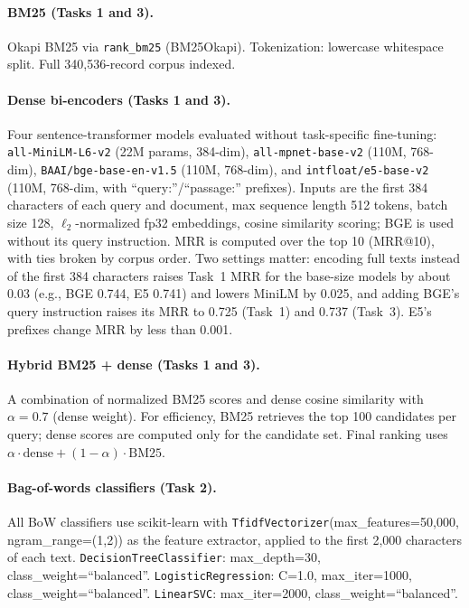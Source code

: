 \documentclass{article}
\begin{document}
\paragraph{BM25 (Tasks 1 and 3).} 
Okapi BM25 via \texttt{rank\_bm25} (BM25Okapi). Tokenization: lowercase whitespace split. Full 340,536-record corpus indexed.

\paragraph{Dense bi-encoders (Tasks 1 and 3).}
Four sentence-transformer models evaluated without task-specific fine-tuning: \texttt{all-MiniLM-L6-v2} (22M params, 384-dim), \texttt{all-mpnet-base-v2} (110M, 768-dim), \texttt{BAAI/bge-base-en-v1.5} (110M, 768-dim), and \texttt{intfloat/e5-base-v2} (110M, 768-dim, with ``query:''/``passage:'' prefixes). Inputs are the first 384 characters of each query and document, max sequence length 512 tokens, batch size 128, $\ell_2$-normalized fp32 embeddings, cosine similarity scoring; BGE is used without its query instruction. MRR is computed over the top 10 (MRR@10), with ties broken by corpus order. Two settings matter: encoding full texts instead of the first 384 characters raises Task~1 MRR for the base-size models by about 0.03 (e.g., BGE 0.744, E5 0.741) and lowers MiniLM by 0.025, and adding BGE's query instruction raises its MRR to 0.725 (Task~1) and 0.737 (Task~3). E5's prefixes change MRR by less than 0.001.

\paragraph{Hybrid BM25 + dense (Tasks 1 and 3).}
A combination of normalized BM25 scores and dense cosine similarity with $\alpha{=}0.7$ (dense weight). For efficiency, BM25 retrieves the top 100 candidates per query; dense scores are computed only for the candidate set. Final ranking uses $\alpha \cdot \text{dense} + (1{-}\alpha) \cdot \text{BM25}$.

\paragraph{Bag-of-words classifiers (Task 2).}
All BoW classifiers use scikit-learn with \texttt{TfidfVectorizer}(max\_features=50{,}000, ngram\_range=(1,2)) as the feature extractor, applied to the first 2,000 characters of each text. \texttt{DecisionTreeClassifier}: max\_depth=30, class\_weight=``balanced''. \texttt{LogisticRegression}: C=1.0, max\_iter=1000, class\_weight=``balanced''. \texttt{LinearSVC}: max\_iter=2000, class\_weight=``balanced''.
\end{document}
